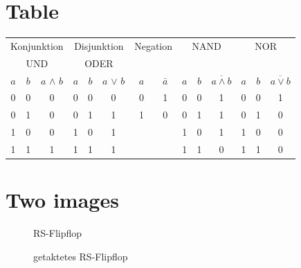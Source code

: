 \documentclass[12pt, a4paper, twopage]{scrartcl}
\begin{document}
\section{Table}
\begin{center}
	\begin{tabular}[c]{c | c | c || c| c | c || c | c || c | c | c || c| c| c}
		\multicolumn{3}{c||}{Konjunktion}	&	\multicolumn{3}{c||}{Disjunktion} & \multicolumn{2}{c||}{Negation} & \multicolumn{3}{c||}{NAND} & \multicolumn{3}{c}{NOR}\\
		\multicolumn{3}{c||}{UND}	&	\multicolumn{3}{c||}{ODER} & \multicolumn{2}{c||}{} & \multicolumn{3}{c||}{} & \multicolumn{3}{c}{}\\
		\hline
		$a$ & $b$ & $a$ $\wedge$ $b$ & $a$ & $b$ & $a$ $\vee$ $b$ & $a$ & $\bar{a}$ & $a$ & $b$ & $\overline{a \wedge b}$ & $a$ & $b$ & $\overline{a \vee b}$\\
		\hline
		0 & 0 & 0 & 0 & 0 & 0 & 0 & 1 & 0 & 0 & 1 & 0 & 0 & 1\\
		0 & 1 & 0 & 0 & 1 & 1 & 1 & 0 & 0 & 1 & 1 & 0 & 1 & 0\\
		1 & 0 & 0 & 1 & 0 & 1 & & & 1 & 0 & 1 & 1 & 0 & 0\\
		1 & 1 & 1 & 1 & 1 & 1 & & & 1 & 1 & 0 & 1 & 1 & 0\\
		\hline
	\end{tabular}
\end{center}














\section{Two images}

\begin{figure}[h!]
	\centering
		\centering
		\caption{RS-Flipflop}%
		\label{fig:rsflipflop}
	\endminipage\hspace{1cm}   
		\centering
		\caption{getaktetes RS-Flipflop}%
		\label{fig:rsflipfloptakt}
	\endminipage
\end{figure}
\end{document}
